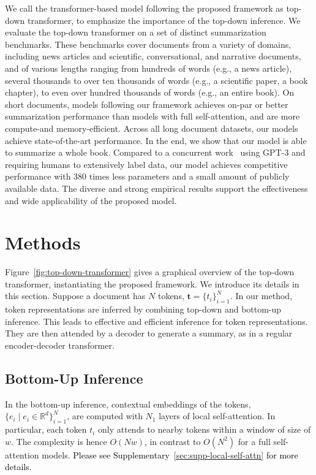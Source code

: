 \documentclass{article} \usepackage{iclr2022_conference,times}
\begin{document}
We call the transformer-based model following the proposed framework as top-down transformer, to emphasize the importance of the top-down inference.  We evaluate the top-down transformer on a set of distinct summarization benchmarks. These benchmarks cover documents from a variety of domains, including news articles and scientific, conversational, and narrative documents, and of various lengths ranging from hundreds of words (e.g., a news article), several thousands to over ten thousands of words (e.g., a scientific paper, a book chapter), to even over hundred thousands of words (e.g., an entire book). On short documents, models following our framework achieves on-par or better summarization performance than models with full self-attention, and are more compute-and memory-efficient. Across all long document datasets, our models achieve state-of-the-art performance. In the end, we show that our model is able to summarize a whole book. Compared to a concurrent work~\citep{wu2021recursively} using GPT-3 and requiring humans to extensively label data, our model achieves competitive performance with 380 times less parameters and a small amount of publicly available data. The diverse and strong empirical results support the effectiveness and wide applicability of the proposed model.





















\section{Methods}
Figure~\ref{fig:top-down-transformer} gives a graphical overview of the top-down transformer, instantiating the proposed framework. We introduce its details in this section. Suppose a document has $N$ tokens, $\bm{t} = \{t_i\}_{i=1}^N$. In our method, token representations are inferred by combining top-down and bottom-up inference. This leads to effective and efficient inference for token representations. They are then attended by a decoder to generate a summary, as in a regular encoder-decoder transformer.



\subsection{Bottom-Up Inference}
In the bottom-up inference, contextual embeddings of the tokens, $\{e_i \mid e_i \in \mathbb{R}^d\}_{i=1}^N$, are computed with $N_1$ layers of local self-attention. In particular, each token $t_i$ only attends to nearby tokens within a window of size of $w$. The complexity is hence $O(Nw)$, in contrast to $O(N^2)$ for a full self-attention models. \textcolor{black}{Please see Supplementary~\ref{sec:supp-local-self-attn} for more details.} 
\end{document}
